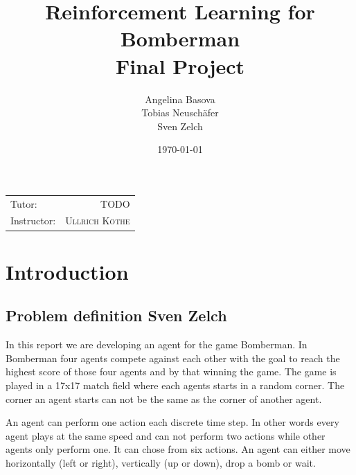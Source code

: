 \documentclass[
	letterpaper, %
	12pt, %
]{CSUniSchoolLabReport}
\title{\textbf{Reinforcement Learning for Bomberman \\ Final Project}} %
\author{Angelina Basova \\ Tobias Neuschäfer \\Sven Zelch} %
\date{\today} %
\begin{document}
\maketitle %

\begin{center}
	\begin{tabular}{l r}
		Tutor:      & TODO                     \\
		Instructor: & \textsc{Ullrich K\"othe} %
	\end{tabular}
\end{center}



\newpage

\tableofcontents
\newpage

\listoffigures
\listoftables
\newpage



\section{Introduction}

\subsection{Problem definition \tiny Sven Zelch}
In this report we are developing an agent for the game Bomberman.
In Bomberman four agents compete against each other with the goal to reach the highest score of those four agents and by that winning the game.
The game is played in a 17x17 match field where each agents starts in a random corner.
The corner an agent starts can not be the same as the corner of another agent.

An agent can perform one action each discrete time step.
In other words every agent plays at the same speed and can not perform two actions while other agents only perform one.
It can chose from six actions.
An agent can either move horizontally (left or right), vertically (up or down), drop a bomb or wait.
\end{document}
